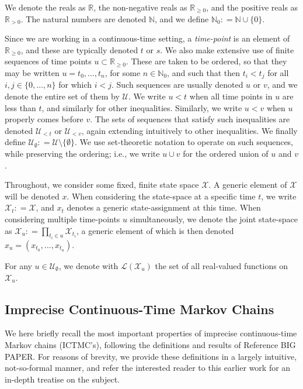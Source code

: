 \documentclass[twoside,11pt]{article}
\newcommand{\nats}{\mathbb{N}}
\newcommand{\natswith}{\nats_{0}}
\newcommand{\reals}{\mathbb{R}}
\newcommand{\realspos}{\reals_{>0}}
\newcommand{\realsnonneg}{\reals_{\geq 0}}
\newcommand{\states}{\mathcal{X}}
\newcommand{\gambles}{\mathcal{L}}
\newcommand{\coloneqq}{:\!=}
\begin{document}
We denote the reals as $\reals$, the non-negative reals as $\realsnonneg$, and the positive reals as $\realspos$. The natural numbers are denoted $\nats$, and we define $\natswith\coloneqq\nats\cup\{0\}$.

Since we are working in a continuous-time setting, a \emph{time-point} is an element of $\realsnonneg$, and these are typically denoted $t$ or $s$. We also make extensive use of finite sequences of time points $u\subset\realsnonneg$. These are taken to be ordered, so that they may be written $u=t_0,\ldots,t_n$, for some $n\in\natswith$, and such that then $t_i<t_j$ for all $i,j\in\{0,\ldots,n\}$ for which $i< j$. Such sequences are usually denoted $u$ or $v$, and we denote the entire set of them by $\mathcal{U}$. We write $u<t$ when all time points in $u$ are less than $t$, and similarly for other inequalities. Similarly, we write $u<v$ when $u$ properly comes before $v$. The sets of sequences that satisfy such inequalities are denoted $\mathcal{U}_{<t}$ or $\mathcal{U}_{<v}$, again extending intuitively to other inequalities. We finally define $\mathcal{U}_\emptyset\coloneqq \mathcal{U}\setminus\{\emptyset\}$. We use set-theoretic notation to operate on such sequences, while preserving the ordering; i.e., we write $u\cup v$ for the ordered union of $u$ and $v$.

Throughout, we consider some fixed, finite state space $\states$. A generic element of $\states$ will be denoted $x$. When considering the state-space at a specific time $t$, we write $\states_t\coloneqq\states$, and $x_t$ denotes a generic state-assignment at this time. When considering multiple time-points $u$ simultaneously, we denote the joint state-space as $\states_u\coloneqq\prod_{t_i\in u}\states_{t_i}$, a generic element of which is then denoted $x_u=(x_{t_0},\ldots,x_{t_n})$.

For any $u\in\mathcal{U}_\emptyset$, we denote with $\gambles(\states_u)$ the set of all real-valued functions on $\states_u$.

\subsection{Imprecise Continuous-Time Markov Chains}

We here briefly recall the most important properties of imprecise continuous-time Markov chains (ICTMC's), following the definitions and results of Reference BIG PAPER. For reasons of brevity, we provide these definitions in a largely intuitive, not-so-formal manner, and refer the interested reader to this earlier work for an in-depth treatise on the subject.
\end{document}
